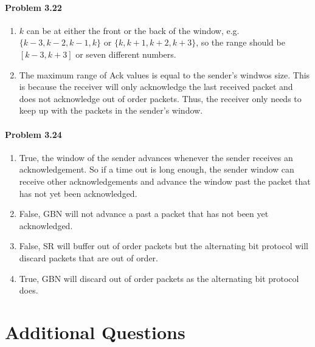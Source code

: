 \documentclass[12pt]{article}
\begin{document}
\paragraph{Problem 3.22}
\begin{enumerate}[label=\textbf{Part \alph*)},leftmargin=*,align=left]
	\item $k$ can be at either the front or the back of the window, e.g. $\{k-3, k-2, k-1, k\}$ or $\{k, k+1, k+2, k+3\}$, so the range should be $[k-3, k+3]$ or seven different numbers. 
	\item The maximum range of Ack values is equal to the sender's windwos size. This is because the receiver will only acknowledge the last received packet and does not acknowledge out of order packets. Thus, the receiver only needs to keep up with the packets in the sender's window.
\end{enumerate}

\paragraph{Problem 3.24}
\begin{enumerate}[label=\textbf{Part \alph*)},leftmargin=*,align=left]
	\item True, the window of the sender advances whenever the sender receives an acknowledgement. So if a time out is long enough, the sender window can receive other acknowledgements and advance the window past the packet that has not yet been acknowledged. 
	\item False, GBN will not advance a past a packet that has not been yet acknowledged. 
	\item False, SR will buffer out of order packets but the alternating bit protocol will discard packets that are out of order.
	\item True, GBN will discard out of order packets as the alternating bit protocol does.
\end{enumerate}
\section{Additional Questions}
\end{document}
